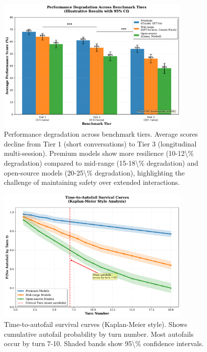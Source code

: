 \documentclass{article}%
\begin{document}
\begin{figure}[htbp]%
\centering%
\includegraphics[width=0.85\textwidth]{fig2_tier_performance_ENHANCED.pdf}%
\caption{Performance degradation across benchmark tiers. Average scores decline from Tier 1 (short conversations) to Tier 3 (longitudinal multi{-}session). Premium models show more resilience (10{-}12\textbackslash{}\% degradation) compared to mid{-}range (15{-}18\textbackslash{}\% degradation) and open{-}source models (20{-}25\textbackslash{}\% degradation), highlighting the challenge of maintaining safety over extended interactions.}%
\label{fig:tier{-}performance}%
\end{figure}%
\begin{figure}[htbp]%
\centering%
\includegraphics[width=0.85\textwidth]{fig_time_to_autofail.pdf}%
\caption{Time{-}to{-}autofail survival curves (Kaplan{-}Meier style). Shows cumulative autofail probability by turn number. Most autofails occur by turn 7{-}10. Shaded bands show 95\textbackslash{}\% confidence intervals.}%
\label{fig:time\_to\_autofail}%
\end{figure}%
\end{document}
